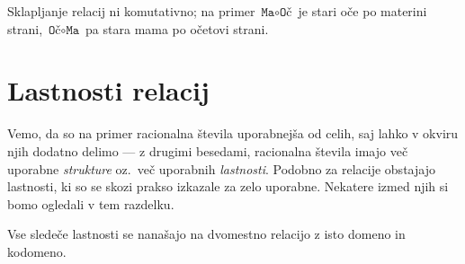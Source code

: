 \begin{zgled}
                        Sklapljanje relacij ni komutativno; na primer $\texttt{Ma} \circ \texttt{Oč}$ je stari oče po materini strani, $\texttt{Oč} \circ \texttt{Ma}$ pa stara mama po očetovi strani.

                \end{zgled}



        \section{Lastnosti relacij}\label{RAZDELEK: Lastnosti relacij}

                Vemo, da so na primer racionalna števila uporabnejša od celih, saj lahko v okviru njih dodatno delimo --- z drugimi besedami, racionalna števila imajo več uporabne \emph{strukture} oz.~več uporabnih \emph{lastnosti}. Podobno za relacije obstajajo lastnosti, ki so se skozi prakso izkazale za zelo uporabne. Nekatere izmed njih si bomo ogledali v tem razdelku.

                Vse sledeče lastnosti se nanašajo na dvomestno relacijo z isto domeno in kodomeno.


